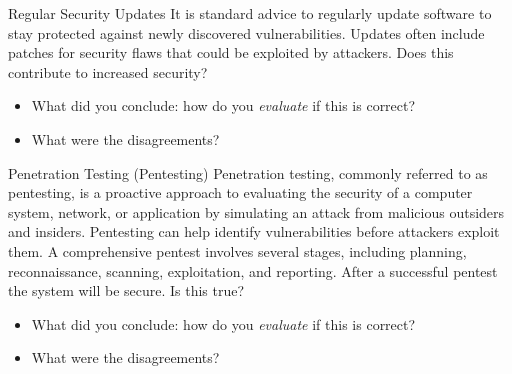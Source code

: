 \begin{frame}
  \begin{block}{Regular Security Updates}
    It is standard advice to regularly update software to stay protected
    against newly discovered vulnerabilities. Updates often include patches
    for security flaws that could be exploited by attackers. Does this contribute 
    to increased security?
  \end{block}

  \begin{question}
    \begin{itemize}
      \item What did you conclude: how do you \emph{evaluate} if this is 
        correct?
      \item What were the disagreements?
    \end{itemize}
  \end{question}
\end{frame}

\begin{frame}
  \begin{block}{Penetration Testing (Pentesting)}
    Penetration testing, commonly referred to as pentesting, is a proactive
    approach to evaluating the security of a computer system, network,
    or application by simulating an attack from malicious outsiders and
    insiders. Pentesting can help identify vulnerabilities before attackers
    exploit them. A comprehensive pentest involves several stages, including
    planning, reconnaissance, scanning, exploitation, and reporting. After a 
    successful pentest the system will be secure. Is this true?
  \end{block}

  \begin{question}
    \begin{itemize}
      \item What did you conclude: how do you \emph{evaluate} if this is 
        correct?
      \item What were the disagreements?
    \end{itemize}
  \end{question}
\end{frame}

